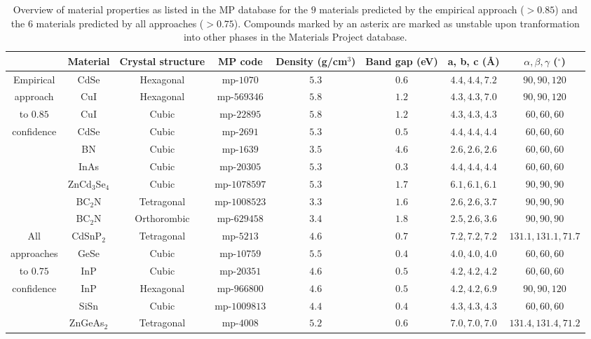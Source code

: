 \documentclass[superscriptaddress,unsortedaddress,
 amsmath,amssymb,
 aps,
]{revtex4-2}
\begin{document}
\begin{table}[b]
    \centering 
    \caption{Overview of material properties as listed in the MP database for the $9$ materials predicted by the empirical approach ($>0.85$) and the $6$ materials predicted by all approaches ($>0.75$). Compounds marked by an asterix are marked as unstable upon tranformation into other phases in the Materials Project database. }
    \begin{tabular}{c|c c c c c c c }
      & Material & Crystal structure & MP code & Density (g/cm$^3$) & Band gap (eV) & a, b, c (\AA) & $\alpha,\beta,\gamma$ ($^\circ$) \\
    \hline 
    Empirical & CdSe & Hexagonal & mp-$1070$ & $5.3$ & $0.6$ & $4.4,4.4,7.2$ & $90,90,120$ \\
    approach  & CuI & Hexagonal & mp-$569346$ & $5.8$ & $1.2$ & $4.3,4.3,7.0$ & $90,90,120$ \\ 
    to $0.85$  & CuI & Cubic & mp-$22895$ & $5.8$ & $1.2$ & $4.3,4.3,4.3$ & $60,60,60$  \\ 
    confidence & CdSe & Cubic & mp-$2691$ & $5.3$ & $0.5$ & $4.4,4.4,4.4$ & $60,60,60$  \\
     & BN & Cubic & mp-$1639$ & $3.5$ & $4.6$ & $2.6,2.6,2.6$ & $60,60,60$  \\
     & InAs & Cubic & mp-$20305$ & $5.3$ & $0.3$ & $4.4,4.4,4.4$ & $60,60,60$ \\
     & ZnCd$_3$Se$_4$ & Cubic & mp-$1078597$ & $5.3$ & $1.7$ & $6.1,6.1,6.1$ & $90,90,90$ \\
     & BC$_2$N & Tetragonal & mp-$1008523$ & $3.3$ & $1.6$ & $2.6,2.6,3.7$ & $90,90,90$ \\
     & BC$_2$N & Orthorombic & mp-$629458$ & $3.4$ & $1.8$ & $2.5,2.6,3.6$ & $90,90,90$ \\
    \hline 
    All & CdSnP$_2$ & Tetragonal & mp-$5213$ & $4.6$ & $0.7$ & $7.2,7.2,7.2$ & $131.1,131.1,71.7$ \\
    approaches & GeSe & Cubic & mp-$10759$ & $5.5$ & $0.4$ & $4.0,4.0,4.0$ & $60,60,60$ \\
    to $0.75$  & InP & Cubic & mp-$20351$ & $4.6$ & $0.5$ & $4.2,4.2,4.2$ &  $60,60,60$\\ 
    confidence & InP & Hexagonal & mp-$966800$ & $4.6$ & $0.5$ & $4.2,4.2,6.9$ & $90,90,120$ \\ 
     & SiSn & Cubic & mp-$1009813$ & $4.4$ & $0.4$ & $4.3,4.3,4.3$ & $60,60,60$ \\
     & ZnGeAs$_2$ & Tetragonal & mp-$4008$ & $5.2$ & $0.6$ & $7.0,7.0,7.0$ & $131.4,131.4,71.2$ \\
    \end{tabular}
    \label{tab:materialproperties}
\end{table}
\end{document}
